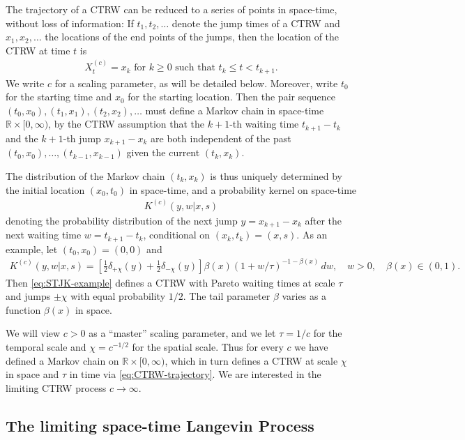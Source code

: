 \documentclass[a4paper,12pt]{elsarticle}
\numberwithin{equation}{section}
\theoremstyle{plain}
\theoremstyle{definition}
\theoremstyle{remark}
\numberwithin{equation}{section}
\newcommand{\spc}{\mathbb R}
\newcommand{\spctim}{\spc \times [0,\infty)}
\newcommand{\1}{\mathbf 1}
\begin{document}
The trajectory of a CTRW can be reduced to a series of points in
space-time, without loss of information: If $t_1, t_2, \ldots$
denote the jump times of a CTRW and $x_1, x_2, \ldots$ the locations
of the end points of the jumps, then the location of the CTRW at time
$t$ is
\begin{align} \label{eq:CTRW-trajectory}
X^{(c)}_t = x_k \text{ for } k \ge 0 \text{ such that }
t_k \le t < t_{k+1}.
\end{align}
We write $c$ for a scaling parameter, as will be detailed below.
Moreover, write $t_0$ for the starting time and $x_0$ for the starting
location. Then the pair sequence
$(t_0, x_0), (t_1, x_1), (t_2, x_2), \ldots$
must define a Markov chain in space-time $\spctim$,
by the CTRW assumption that the $k+1$-th waiting time $t_{k+1} - t_k$
and the $k+1$-th jump $x_{k+1} - x_k$ are both independent of the past
$(t_0, x_0), \ldots, (t_{k-1}, x_{k-1})$ given the current $(t_k, x_k)$.

The distribution of the Markov chain $(t_k, x_k)$ is thus uniquely
determined by the initial location $(x_0, t_0)$ in space-time,
and a probability kernel on space-time
\begin{align} \label{eq:STJK}
K^{(c)}(y,w | x,s)
\end{align}
denoting the probability distribution of the next jump 
$y = x_{k+1} - x_k$ after the next waiting time
$w = t_{k+1} - t_k$, conditional on $(x_k, t_k) = (x,s)$.
As an example, let $(t_0, x_0) = (0,0)$ and
\begin{align} \label{eq:STJK-example}
K^{(c)}(y,w | x,s) = \left[\frac{1}{2} \delta_{+\chi}(y) + \frac{1}{2} \delta_{-\chi}(y)\right] \beta(x) (1+w/\tau)^{-1-\beta(x)} \, dw,
\quad w > 0, \quad \beta(x) \in (0,1).
\end{align}
Then \eqref{eq:STJK-example} defines a CTRW with Pareto waiting times at scale
$\tau$ and jumps $\pm \chi$ with equal probability $1/2$.  The tail parameter 
$\beta$ varies as a function $\beta(x)$ in space. 


We will view $c > 0$ as a ``master'' scaling parameter, and we let
$\tau = 1/c$ for the temporal scale and $\chi = c^{-1/2}$ for the
spatial scale.
Thus for every $c$ we have defined a Markov chain on $\spctim$, which
in turn defines a CTRW at scale $\chi$ in space and $\tau$ in time
via \eqref{eq:CTRW-trajectory}.
We are interested in the limiting CTRW process $c \to \infty$.


\subsection{The limiting space-time Langevin Process}
\end{document}

